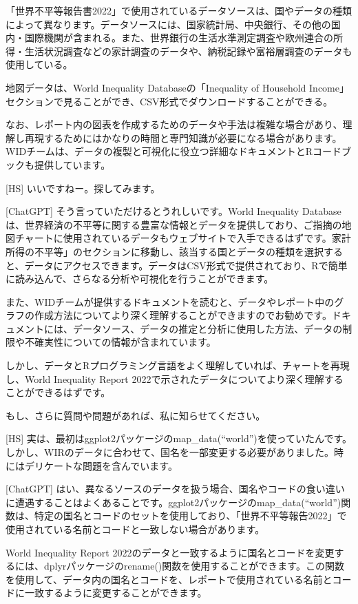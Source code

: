\documentclass[
]{bxjsbook}
\theoremstyle{definition}
\theoremstyle{definition}
\theoremstyle{definition}
\theoremstyle{definition}
\theoremstyle{remark}
\begin{document}
「世界不平等報告書2022」で使用されているデータソースは、国やデータの種類によって異なります。データソースには、国家統計局、中央銀行、その他の国内・国際機関が含まれる。また、世界銀行の生活水準測定調査や欧州連合の所得・生活状況調査などの家計調査のデータや、納税記録や富裕層調査のデータも使用している。

地図データは、World Inequality Databaseの「Inequality of Household Income」セクションで見ることができ、CSV形式でダウンロードすることができる。

なお、レポート内の図表を作成するためのデータや手法は複雑な場合があり、理解し再現するためにはかなりの時間と専門知識が必要になる場合があります。WIDチームは、データの複製と可視化に役立つ詳細なドキュメントとRコードブックも提供しています。

{[}HS{]} いいですねー。探してみます。

{[}ChatGPT{]} そう言っていただけるとうれしいです。World Inequality Databaseは、世界経済の不平等に関する豊富な情報とデータを提供しており、ご指摘の地図チャートに使用されているデータもウェブサイトで入手できるはずです。家計所得の不平等」のセクションに移動し、該当する国とデータの種類を選択すると、データにアクセスできます。データはCSV形式で提供されており、Rで簡単に読み込んで、さらなる分析や可視化を行うことができます。

また、WIDチームが提供するドキュメントを読むと、データやレポート中のグラフの作成方法についてより深く理解することができますのでお勧めです。ドキュメントには、データソース、データの推定と分析に使用した方法、データの制限や不確実性についての情報が含まれています。

しかし、データとRプログラミング言語をよく理解していれば、チャートを再現し、World Inequality Report 2022で示されたデータについてより深く理解することができるはずです。

もし、さらに質問や問題があれば、私に知らせてください。

{[}HS{]} 実は、最初はggplot2パッケージのmap\_data(``world'')を使っていたんです。しかし、WIRのデータに合わせて、国名を一部変更する必要がありました。時にはデリケートな問題を含んでいます。

{[}ChatGPT{]} はい、異なるソースのデータを扱う場合、国名やコードの食い違いに遭遇することはよくあることです。ggplot2パッケージのmap\_data(``world'')関数は、特定の国名とコードのセットを使用しており、「世界不平等報告2022」で使用されている名前とコードと一致しない場合があります。

World Inequality Report 2022のデータと一致するように国名とコードを変更するには、dplyrパッケージのrename()関数を使用することができます。この関数を使用して、データ内の国名とコードを、レポートで使用されている名前とコードに一致するように変更することができます。
\end{document}
